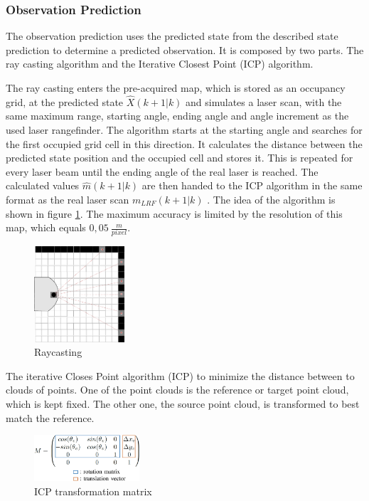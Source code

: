 \subsubsection{Observation Prediction}
\label{subsubsec:Observation_Prediction}
The observation prediction uses the predicted state from the described state prediction to determine a predicted observation.
It is composed by two parts. The ray casting algorithm and the Iterative Closest Point (ICP) algorithm.

The ray casting enters the pre-acquired map, which is stored as an occupancy grid, at the predicted state $\hat{X}(k+1|k)$ and simulates a laser scan, with the same maximum range, starting angle, ending angle and angle increment as the used laser rangefinder. The algorithm starts at the starting angle and searches for the first occupied grid cell in this direction. It calculates the distance between the predicted state position and the occupied cell and stores it. This is repeated for every laser beam until the ending angle of the real laser is reached. The calculated values $\hat{m}(k+1|k)$ are then handed to the ICP algorithm in the same format as the real laser scan $m_{LRF}(k+1|k)$ .
The idea of the algorithm is shown in figure \ref{fig:Raycasting}. The maximum accuracy is limited by the resolution of this map, which equals $0,05~\frac{m}{pixel}$.
\begin{figure}[h!]
\centering
\includegraphics[width=0.3\textwidth]{figures/raycast.pdf}
      \caption{Raycasting}
      \label{fig:Raycasting}
\end{figure}

The iterative Closes Point algorithm (ICP) to minimize the distance between to clouds of points. One of the point clouds is the reference or target point cloud, which is kept fixed. The other one, the source point cloud, is transformed to best match the reference.
\begin{figure}[h!]
\centering
\includegraphics[width=0.35\textwidth]{figures/M}
      \caption{ICP transformation matrix}
      \label{fig:transformation_matrix}
\end{figure}

